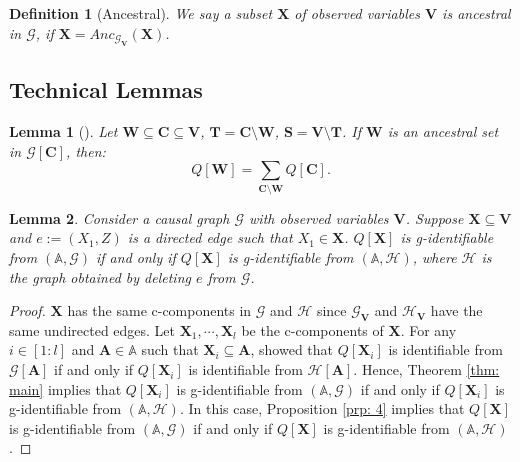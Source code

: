 \documentclass[accepted]{uai2022}
\newtheorem{lemma}{Lemma}
\newtheorem{definition}{Definition}
\newcommand{\Anc}[2]{\textit{Anc}_{#2}(#1)}
\newcommand{\V}[0]{\mathbf{V}}
\newcommand{\C}[0]{\mathbf{C}}
\newcommand{\W}[0]{\mathbf{W}}
\newcommand{\X}[0]{\mathbf{X}}
\newcommand{\A}[0]{\mathbf{A}}
\newcommand{\T}[0]{\mathbf{T}}
\newcommand{\G}[0]{\mathcal{G}}
\begin{document}
    \begin{definition}[Ancestral]
        We say a subset $\X$ of observed variables $\V$ is ancestral in $\G$, if $\X = \Anc{\X}{\G_{\V}}$.
    \end{definition}

    
    \subsection{Technical Lemmas}
        \begin{lemma}[\citep{tian2003ID}]\label{lemma: Q-marginal}
            Let $\W \subseteq \C \subseteq \V$, $\T = \C \setminus \W$, $\mathbf{S}=\V \setminus \T$. 
            If $\W$ is an ancestral set in $\G[\C]$, then:
            \begin{equation*}
                Q[\W] = \sum_{\C \setminus \W}Q[\C].
            \end{equation*}
        \end{lemma}
        
        \begin{lemma} \label{lemma: prp3 - 1}
        Consider a causal graph $\G$ with observed variables $\V$.
            Suppose $\X \subseteq \V$ and $e:=(X_1,Z)$ is a directed edge such that $X_1\in\X$.
            $Q[\X]$ is g-identifiable from $(\mathbb{A},\G)$ if and only if $Q[\X]$ is g-identifiable from $(\mathbb{A}, \mathcal{H})$, where $\mathcal{H}$ is the graph obtained by deleting $e$ from $\G$.
        \end{lemma}
        \begin{proof}
            $\X$ has the same c-components in $\G$ and $\mathcal{H}$ since $\G_{\V}$ and $\mathcal{H}_{\V}$ have the same undirected edges. 
            Let $\X_1,\cdots,\X_l$ be the c-components of $\X$. 
            For any $i\in [1:l]$ and $\A \in \mathbb{A}$ such that $\X_i \subseteq \A$, \cite{huang2008completeness} showed that $Q[\X_i]$ is identifiable from $\G[\A]$ if and only if $Q[\X_i]$ is identifiable from $\mathcal{H}[\A]$. 
            Hence, Theorem \ref{thm: main} implies that $Q[\X_i]$ is g-identifiable from $(\mathbb{A},\G)$ if and only if $Q[\X_i]$ is g-identifiable from $(\mathbb{A},\mathcal{H})$.
            In this case, Proposition \ref{prp: 4} implies that $Q[\X]$ is g-identifiable from $(\mathbb{A},\G)$ if and only if $Q[\X]$ is g-identifiable from $(\mathbb{A},\mathcal{H})$.
        \end{proof}
    
\end{document}
